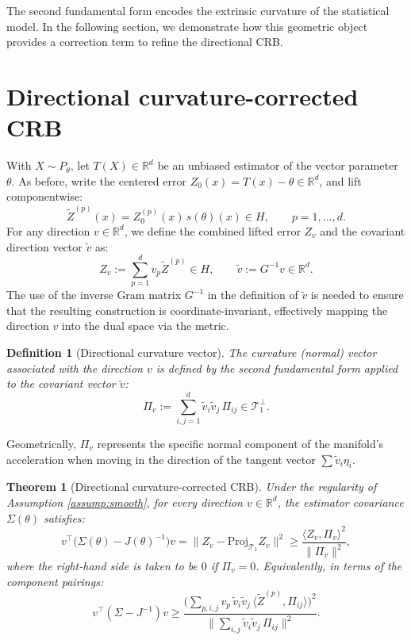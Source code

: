 \documentclass[pdflatex,sn-mathphys-num]{sn-jnl}%
\newcommand{\ip}[2]{\langle #1,#2\rangle}
\theoremstyle{thmstyleone}%
\newtheorem{theorem}{Theorem}%
\theoremstyle{thmstyletwo}%
\theoremstyle{thmstylethree}%
\newtheorem{definition}{Definition}%
\begin{document}
The second fundamental form encodes the extrinsic curvature of the statistical model. In the following section, we demonstrate how this geometric object provides a correction term to refine the directional CRB.

\section{Directional curvature-corrected CRB}

With \(X\sim P_\theta\), let \(T(X)\in\mathbb{R}^d\) be an unbiased estimator of the vector parameter \(\theta\). As before, write the centered error \(Z_0(x)=T(x)-\theta\in\mathbb{R}^d\), and lift componentwise:
\[
\widetilde Z^{(p)}(x) = Z_0^{(p)}(x)\, s(\theta)(x) \in H,\qquad p=1,\dots,d.
\]
For any direction $v\in\mathbb{R}^d$, we define the combined lifted error $Z_v$ and the covariant direction vector $\widetilde v$ as:
\[
Z_v := \sum_{p=1}^d v_p \widetilde Z^{(p)} \in H,\qquad
\widetilde v := G^{-1} v\in\mathbb{R}^d.
\]
The use of the inverse Gram matrix $G^{-1}$ in the definition of \(\widetilde v\) is needed to ensure that the resulting construction is coordinate-invariant, effectively mapping the direction $v$ into the dual space via the metric.

\begin{definition}[Directional curvature vector]
The curvature (normal) vector associated with the direction $v$ is defined by the second fundamental form applied to the covariant vector $\widetilde v$:
\[
\Pi_v := \sum_{i,j=1}^d \widetilde v_i \widetilde v_j \,\Pi_{ij} \in \mathcal{T}_1^\perp.
\]
\end{definition}

Geometrically, $\Pi_v$ represents the specific normal component of the manifold's acceleration when moving in the direction of the tangent vector $\sum \widetilde v_i \eta_i$.

\begin{theorem}[Directional curvature-corrected CRB]\label{thm:dir}
Under the regularity of Assumption \ref{assump:smooth}, for every direction $v\in\mathbb{R}^d$, the estimator covariance $\Sigma(\theta)$ satisfies:
\begin{equation}
\label{eq:di}
v^\top\!\big(\Sigma(\theta)-J(\theta)^{-1}\big) v
= \|Z_v - \mathrm{Proj}_{\mathcal{T}_1} Z_v\|^2
\ge \frac{\ip{Z_v}{\Pi_v}^{2}}{\|\Pi_v\|^{2}},
\end{equation}
where the right-hand side is taken to be $0$ if $\Pi_v=0$. Equivalently, in terms of the component pairings:
\begin{equation}
\label{eq:ex}
v^\top(\Sigma-J^{-1})v \ge
\frac{\Big(\sum_{p,i,j} v_p\,\widetilde v_i\widetilde v_j\,
\ip{\widetilde Z^{(p)}}{\Pi_{ij}}\Big)^2}
{\big\|\sum_{i,j}\widetilde v_i\widetilde v_j\,\Pi_{ij}\big\|^2}.
\end{equation}
\end{theorem}
\end{document}
